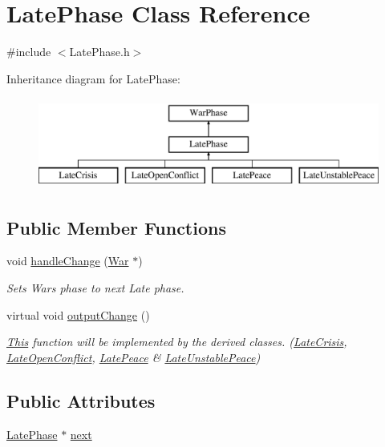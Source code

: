 \hypertarget{class_late_phase}{}\section{Late\+Phase Class Reference}
\label{class_late_phase}


{\ttfamily \#include $<$Late\+Phase.\+h$>$}

Inheritance diagram for Late\+Phase\+:\begin{figure}[H]
\begin{center}
\leavevmode
\includegraphics[height=3.000000cm]{class_late_phase}
\end{center}
\end{figure}
\subsection*{Public Member Functions}
\begin{DoxyCompactItemize}
\item 
void \mbox{\hyperlink{class_late_phase_afe61bf1d21b6534b674ce730cbdcd722}{handle\+Change}} (\mbox{\hyperlink{class_war}{War}} $\ast$)
\begin{DoxyCompactList}\small\item\em Sets Wars phase to next Late phase. \end{DoxyCompactList}\item 
virtual void \mbox{\hyperlink{class_late_phase_a5df8ed1819ba8a826b923f7f3c349245}{output\+Change}} ()
\begin{DoxyCompactList}\small\item\em \mbox{\hyperlink{class_this}{This}} function will be implemented by the derived classes. (\mbox{\hyperlink{class_late_crisis}{Late\+Crisis}}, \mbox{\hyperlink{class_late_open_conflict}{Late\+Open\+Conflict}}, \mbox{\hyperlink{class_late_peace}{Late\+Peace}} \& \mbox{\hyperlink{class_late_unstable_peace}{Late\+Unstable\+Peace}}) \end{DoxyCompactList}\end{DoxyCompactItemize}
\subsection*{Public Attributes}
\begin{DoxyCompactItemize}
\item 
\mbox{\hyperlink{class_late_phase}{Late\+Phase}} $\ast$ \mbox{\hyperlink{class_late_phase_a6a6cbc22ed0481a9ef3fb9c5998f16c3}{next}}
\end{DoxyCompactItemize}


